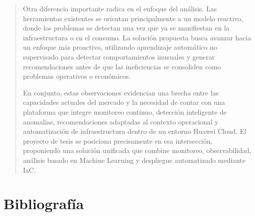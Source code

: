 \documentclass[
]{article}
\begin{document}
\begin{quote}
Otra diferencia importante radica en el enfoque del análisis. Las
herramientas existentes se orientan principalmente a un modelo reactivo,
donde los problemas se detectan una vez que ya se manifiestan en la
infraestructura o en el consumo. La solución propuesta busca avanzar
hacia un enfoque más proactivo, utilizando aprendizaje automático no
supervisado para detectar comportamientos inusuales y generar
recomendaciones antes de que las ineficiencias se consoliden como
problemas operativos o económicos.

En conjunto, estas observaciones evidencian una brecha entre las
capacidades actuales del mercado y la necesidad de contar con una
plataforma que integre monitoreo continuo, detección inteligente de
anomalías, recomendaciones adaptadas al contexto operacional y
automatización de infraestructura dentro de un entorno Huawei Cloud. El
proyecto de tesis se posiciona precisamente en esa intersección,
proponiendo una solución unificada que combine monitoreo,
observabilidad, análisis basado en Machine Learning y despliegue
automatizado mediante IaC.
\end{quote}

\section{\texorpdfstring{\hfill\break
}{ }}\label{section-1}

\section{Bibliografía}\label{bibliografuxeda}
\end{document}

